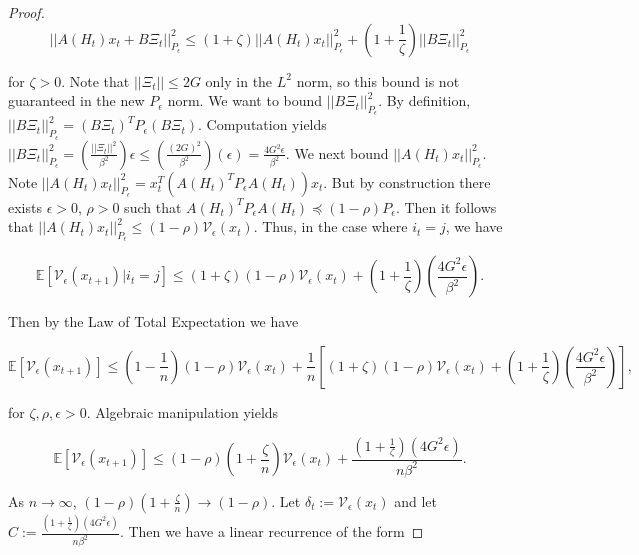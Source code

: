 \documentclass[twoside,11pt]{article}
\begin{document}
\begin{proof}
\begin{equation}
||A(H_t)x_t + B\Xi_t||^2_{P_{\epsilon}} \leq (1 + \zeta)||A(H_t)x_t||^2_{P_{\epsilon}} + (1 + \frac{1}{\zeta})||B\Xi_t||^2_{P_{\epsilon}}
\end{equation}

\noindent
for $\zeta > 0$. Note that $||\Xi_t|| \leq 2G$ only in the $L^2$ norm, so this bound is not guaranteed in the new $P_{\epsilon}$ norm. We want to bound $||B\Xi_t||^2_{P_{\epsilon}}$. By definition, $||B\Xi_t||^2_{P_{\epsilon}} = (B\Xi_t)^T P_{\epsilon} (B\Xi_t)$. Computation yields $||B\Xi_t||^2_{P_{\epsilon}} = (\frac{||\Xi_t||^2}{\beta^2})\epsilon \leq (\frac{(2G)^2}{\beta^2})(\epsilon) = \frac{4G^2\epsilon}{\beta^2}$. We next bound $||A(H_t)x_t||^2_{P_{\epsilon}}$. Note $||A(H_t)x_t||^2_{P_{\epsilon}} = x_t^T(A(H_t)^TP_{\epsilon}A(H_t))x_t$. But by construction there exists $\epsilon >0$, $\rho >0$ such that $A(H_t)^TP_{\epsilon}A(H_t) \preceq (1-\rho)P_{\epsilon}$. Then it follows that $||A(H_t)x_t||^2_{P_{\epsilon}} \leq (1-\rho)\mathcal{V}_{\epsilon}(x_t)$. Thus, in the case where $i_t = j$, we have

\begin{equation}
\mathbb{E}[\mathcal{V}_{\epsilon}(x_{t+1})|i_t = j] \leq (1+\zeta)(1-\rho)\mathcal{V}_{\epsilon}(x_t) + (1 + \frac{1}{\zeta})(\frac{4G^2\epsilon}{\beta^2}).
\end{equation}

\noindent
Then by the Law of Total Expectation we have

\begin{equation}
\mathbb{E}[\mathcal{V}_{\epsilon}(x_{t+1})] \leq (1-\frac{1}{n})(1-\rho)\mathcal{V}_{\epsilon}(x_t) + \frac{1}{n}[(1+\zeta)(1-\rho)\mathcal{V}_{\epsilon}(x_t) + (1 + \frac{1}{\zeta})(\frac{4G^2\epsilon}{\beta^2})],
\end{equation}

\noindent
for $\zeta, \rho, \epsilon >0$. Algebraic manipulation yields

\begin{equation}
\mathbb{E}[\mathcal{V}_{\epsilon}(x_{t+1})] \leq (1-\rho)(1 + \frac{\zeta}{n})\mathcal{V}_{\epsilon}(x_t) + \frac{(1+\frac{1}{\zeta})(4G^2\epsilon)}{n\beta^2}.
\end{equation}

\noindent
As $n \rightarrow \infty$, $(1-\rho)(1+\frac{\zeta}{n}) \rightarrow (1-\rho)$. Let $\delta_t := \mathcal{V}_{\epsilon}(x_t)$ and let $C := \frac{(1+\frac{1}{\zeta})(4G^2\epsilon)}{n\beta^2}$. Then we have a linear recurrence of the form


\end{proof}
\end{document}
